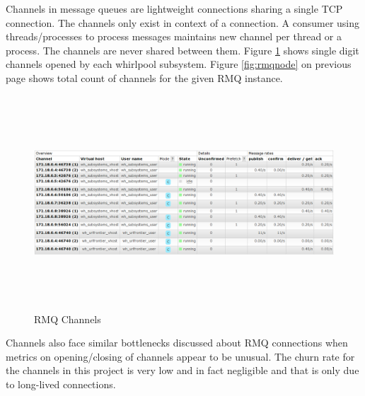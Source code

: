 \noindent
Channels in message queues are lightweight connections sharing a single TCP connection. The channels only exist in context of a connection. A consumer using threads/processes to process messages maintains new channel per thread or a process. The channels are never shared between them. Figure \ref{fig:rmqchannel} shows single digit
channels opened by each whirlpool subsystem. Figure \ref{fig:rmqnode} on previous
page shows total count of channels for the given RMQ instance.

\begin{figure}[h!]
  \centering
  \includegraphics[width=16cm,height=8cm,keepaspectratio]{../media/crawler/rmq_channels.png}
  \caption{RMQ Channels}
  \label{fig:rmqchannel}
\end{figure}

\noindent
Channels also face similar bottlenecks discussed about RMQ connections when metrics
on opening/closing of channels appear to be unusual. The churn rate for the channels
in this project is very low and in fact negligible and that is only due to long-lived connections.

\pagebreak

